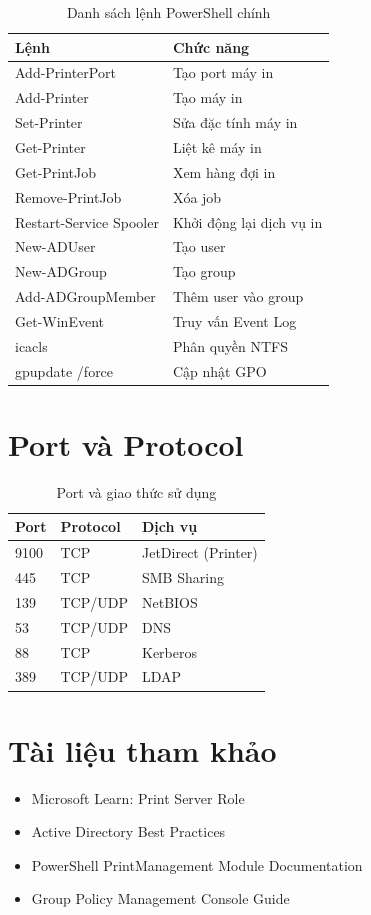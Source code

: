 \begin{table}[htbp]
\centering\small
\begin{tabular}{|l|p{8cm}|}
\hline
\textbf{Lệnh} & \textbf{Chức năng} \\ \hline
Add-PrinterPort & Tạo port máy in \\ \hline
Add-Printer & Tạo máy in \\ \hline
Set-Printer & Sửa đặc tính máy in \\ \hline
Get-Printer & Liệt kê máy in \\ \hline
Get-PrintJob & Xem hàng đợi in \\ \hline
Remove-PrintJob & Xóa job \\ \hline
Restart-Service Spooler & Khởi động lại dịch vụ in \\ \hline
New-ADUser & Tạo user \\ \hline
New-ADGroup & Tạo group \\ \hline
Add-ADGroupMember & Thêm user vào group \\ \hline
Get-WinEvent & Truy vấn Event Log \\ \hline
icacls & Phân quyền NTFS \\ \hline
gpupdate /force & Cập nhật GPO \\ \hline
\end{tabular}
\caption{Danh sách lệnh PowerShell chính}
\end{table}

\section{Port và Protocol}

\begin{table}[htbp]
\centering\small
\begin{tabular}{|l|l|p{5.5cm}|}
\hline
\textbf{Port} & \textbf{Protocol} & \textbf{Dịch vụ} \\ \hline
9100 & TCP & JetDirect (Printer) \\ \hline
445 & TCP & SMB Sharing \\ \hline
139 & TCP/UDP & NetBIOS \\ \hline
53 & TCP/UDP & DNS \\ \hline
88 & TCP & Kerberos \\ \hline
389 & TCP/UDP & LDAP \\ \hline
\end{tabular}
\caption{Port và giao thức sử dụng}
\end{table}

\section{Tài liệu tham khảo}

\begin{itemize}
    \item Microsoft Learn: Print Server Role
    \item Active Directory Best Practices
    \item PowerShell PrintManagement Module Documentation
    \item Group Policy Management Console Guide
\end{itemize}